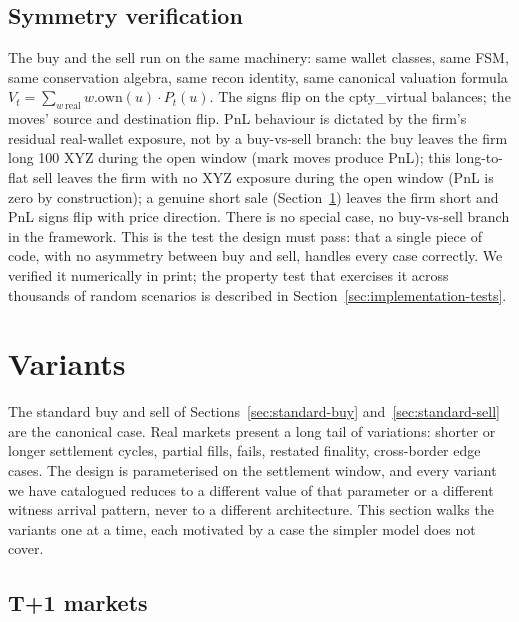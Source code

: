 \documentclass[11pt,a4paper]{article}
\begin{document}
\subsection{Symmetry verification}

The buy and the sell run on the same machinery: same wallet classes, same FSM, same conservation algebra, same recon identity, same canonical valuation formula $V_t = \sum_{w\,\mathrm{real}} w.\mathrm{own}(u) \cdot P_t(u)$. The signs flip on the cpty\_virtual balances; the moves' source and destination flip. PnL behaviour is dictated by the firm's residual real-wallet exposure, not by a buy-vs-sell branch: the buy leaves the firm long 100 XYZ during the open window (mark moves produce PnL); this long-to-flat sell leaves the firm with no XYZ exposure during the open window (PnL is zero by construction); a genuine short sale (Section~\ref{sec:variants}) leaves the firm short and PnL signs flip with price direction. There is no special case, no buy-vs-sell branch in the framework. This is the test the design must pass: that a single piece of code, with no asymmetry between buy and sell, handles every case correctly. We verified it numerically in print; the property test that exercises it across thousands of random scenarios is described in Section~\ref{sec:implementation-tests}.

\clearpage
\section{Variants}
\label{sec:variants}

The standard buy and sell of Sections~\ref{sec:standard-buy} and~\ref{sec:standard-sell} are the canonical case. Real markets present a long tail of variations: shorter or longer settlement cycles, partial fills, fails, restated finality, cross-border edge cases. The design is parameterised on the settlement window, and every variant we have catalogued reduces to a different value of that parameter or a different witness arrival pattern, never to a different architecture. This section walks the variants one at a time, each motivated by a case the simpler model does not cover.

\subsection{T+1 markets}
\label{sec:variant-tplus1}
\end{document}
